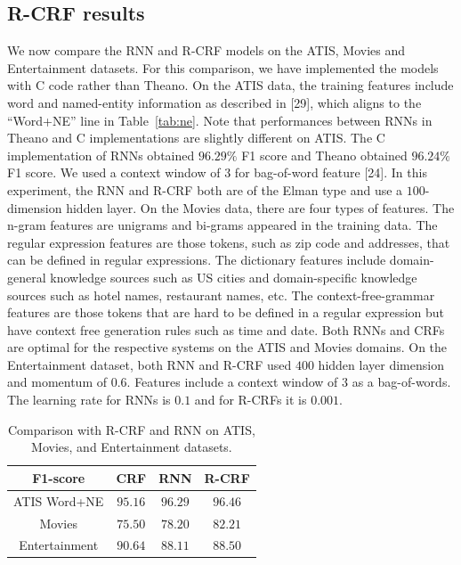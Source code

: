 \subsection{R-CRF results}

We now compare the RNN and R-CRF models on the ATIS, Movies and Entertainment
datasets. For this comparison, we have implemented the models with C code
rather than Theano. On the ATIS data, the training features include word and
named-entity information as described in [29], which aligns to the “Word+NE”
line in Table~\ref{tab:ne}. Note that performances between RNNs in Theano and C
implementations are slightly different on ATIS. The C implementation of RNNs
obtained $96.29\%$ F1 score and Theano obtained $96.24\%$ F1 score. We used a
context window of $3$ for bag-of-word feature [24]. In this experiment, the RNN
and R-CRF both are of the Elman type and use a $100$-dimension hidden layer. On
the Movies data, there are four types of features. The n-gram features are
unigrams and bi-grams appeared in the training data. The regular expression
features are those tokens, such as zip code and addresses, that can be defined
in regular expressions. The dictionary features include domain-general
knowledge sources such as US cities and domain-specific knowledge sources such
as hotel names, restaurant names, etc. The context-free-grammar features are
those tokens that are hard to be defined in a regular expression but have
context free generation rules such as time and date. Both RNNs and CRFs are
optimal for the respective systems on the ATIS and Movies domains. On the
Entertainment dataset, both RNN and R-CRF used $400$ hidden layer dimension and
momentum of $0.6$. Features include a context window of $3$ as a bag-of-words. The
learning rate for RNNs is $0.1$ and for R-CRFs it is $0.001$. 

\begin{table}
\centering
\begin{tabular}{|c|c|c|c|}
\hline
F1-score  &  CRF & RNN & R-CRF\\
\hline
ATIS Word+NE  &  $95.16$ &  $96.29$ &  $96.46$ \\
Movies  & $75.50$   & $78.20$  &  $82.21$ \\
Entertainment &  $90.64$ &  $88.11$  & $88.50$ \\
\hline
\end{tabular}
\caption{Comparison with R-CRF and RNN on ATIS, Movies, and Entertainment datasets.}
\label{tab:rcrf}
\end{table}

